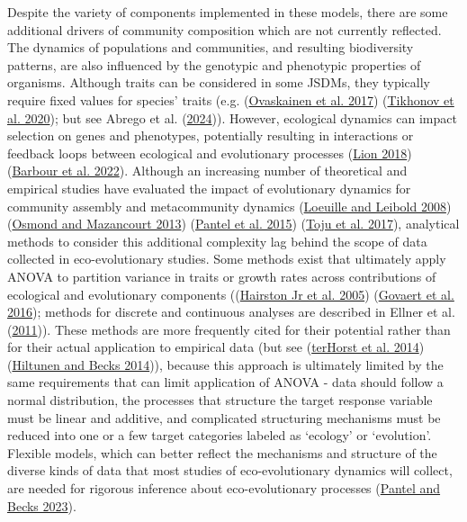\documentclass[
]{article}
\begin{document}
Despite the variety of components implemented in these models, there are some additional drivers of community composition which are not currently reflected. The dynamics of populations and communities, and resulting biodiversity patterns, are also influenced by the genotypic and phenotypic properties of organisms. Although traits can be considered in some JSDMs, they typically require fixed values for species' traits (e.g. (\protect\hyperlink{ref-Ovaskainen2017HMSC}{Ovaskainen et al. 2017}) (\protect\hyperlink{ref-Tikhonov2020}{Tikhonov et al. 2020}); but see Abrego et al. (\protect\hyperlink{ref-Abrego2024}{2024})). However, ecological dynamics can impact selection on genes and phenotypes, potentially resulting in interactions or feedback loops between ecological and evolutionary processes (\protect\hyperlink{ref-Lion2018}{Lion 2018}) (\protect\hyperlink{ref-Barbour2022}{Barbour et al. 2022}). Although an increasing number of theoretical and empirical studies have evaluated the impact of evolutionary dynamics for community assembly and metacommunity dynamics (\protect\hyperlink{ref-Loeuille2008}{Loeuille and Leibold 2008}) (\protect\hyperlink{ref-Osmond2013}{Osmond and Mazancourt 2013}) (\protect\hyperlink{ref-Pantel2015}{Pantel et al. 2015}) (\protect\hyperlink{ref-Toju2017}{Toju et al. 2017}), analytical methods to consider this additional complexity lag behind the scope of data collected in eco-evolutionary studies. Some methods exist that ultimately apply ANOVA to partition variance in traits or growth rates across contributions of ecological and evolutionary components ((\protect\hyperlink{ref-Hairston2005}{Hairston Jr et al. 2005}) (\protect\hyperlink{ref-Govaert2016}{Govaert et al. 2016}); methods for discrete and continuous analyses are described in Ellner et al. (\protect\hyperlink{ref-Ellner2011}{2011})). These methods are more frequently cited for their potential rather than for their actual application to empirical data (but see (\protect\hyperlink{ref-terHorst2014}{terHorst et al. 2014}) (\protect\hyperlink{ref-Hiltunen2014}{Hiltunen and Becks 2014})), because this approach is ultimately limited by the same requirements that can limit application of ANOVA - data should follow a normal distribution, the processes that structure the target response variable must be linear and additive, and complicated structuring mechanisms must be reduced into one or a few target categories labeled as `ecology' or `evolution'. Flexible models, which can better reflect the mechanisms and structure of the diverse kinds of data that most studies of eco-evolutionary dynamics will collect, are needed for rigorous inference about eco-evolutionary processes (\protect\hyperlink{ref-Pantel2023}{Pantel and Becks 2023}).
\end{document}
